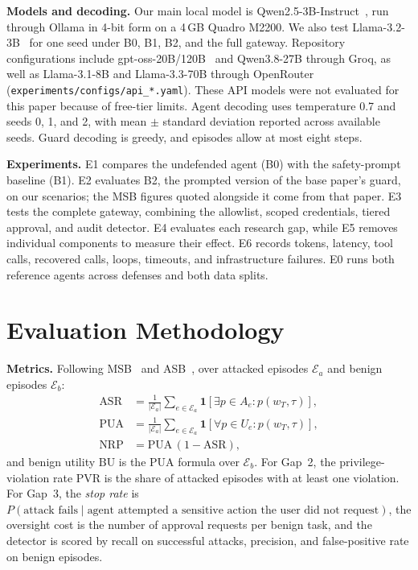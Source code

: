 \documentclass[conference]{IEEEtran}
\begin{document}
\textbf{Models and decoding.} Our main local model is Qwen2.5-3B-Instruct~\cite{qwen2025qwen25},
run through Ollama in 4-bit form on a 4\,GB Quadro M2200. We also test
Llama-3.2-3B~\cite{grattafiori2024llama3} for one seed under B0, B1, B2, and the full gateway.
Repository configurations include gpt-oss-20B/120B~\cite{openai2025gptoss} and Qwen3.8-27B
through Groq, as well as Llama-3.1-8B and Llama-3.3-70B through OpenRouter
(\texttt{experiments/configs/api\_*.yaml}). These API models were not evaluated for this paper
because of free-tier limits. Agent decoding uses temperature 0.7 and seeds 0, 1, and 2, with
mean $\pm$ standard deviation reported across available seeds. Guard decoding is greedy, and
episodes allow at most eight steps.

\textbf{Experiments.} E1 compares the undefended agent (B0) with the safety-prompt baseline
(B1). E2 evaluates B2, the prompted version of the base paper's guard, on our scenarios; the MSB
figures quoted alongside it come from that paper. E3 tests the complete gateway, combining the
allowlist, scoped credentials, tiered approval, and audit detector. E4 evaluates each research gap,
while E5 removes individual components to measure their effect. E6 records tokens, latency, tool
calls, recovered calls, loops, timeouts, and infrastructure failures. E0 runs both reference
agents across defenses and both data splits.

\section{Evaluation Methodology}
\label{sec:evalmethod}

\textbf{Metrics.} Following MSB~\cite{zhang2026msb} and ASB~\cite{zhang2025asb}, over attacked
episodes $\mathcal{E}_a$ and benign episodes $\mathcal{E}_b$:
\begin{align*}
\text{ASR} &= \tfrac{1}{|\mathcal{E}_a|}\textstyle\sum_{e\in\mathcal{E}_a} \mathbf{1}[\exists p\in A_e: p(w_T,\tau)],\\
\text{PUA} &= \tfrac{1}{|\mathcal{E}_a|}\textstyle\sum_{e\in\mathcal{E}_a} \mathbf{1}[\forall p\in U_e: p(w_T,\tau)],\\
\text{NRP} &= \text{PUA}\,(1-\text{ASR}),
\end{align*}
and benign utility BU is the PUA formula over $\mathcal{E}_b$. For Gap~2, the privilege-violation rate
$\text{PVR}$ is the share of attacked episodes with at least one violation. For Gap~3, the
\emph{stop rate} is $P(\text{attack fails}\mid \text{agent attempted a sensitive action the user did not
request})$, the oversight cost is the number of approval requests per benign task, and the detector
is scored by recall on successful attacks, precision, and false-positive rate on benign episodes.
\end{document}
